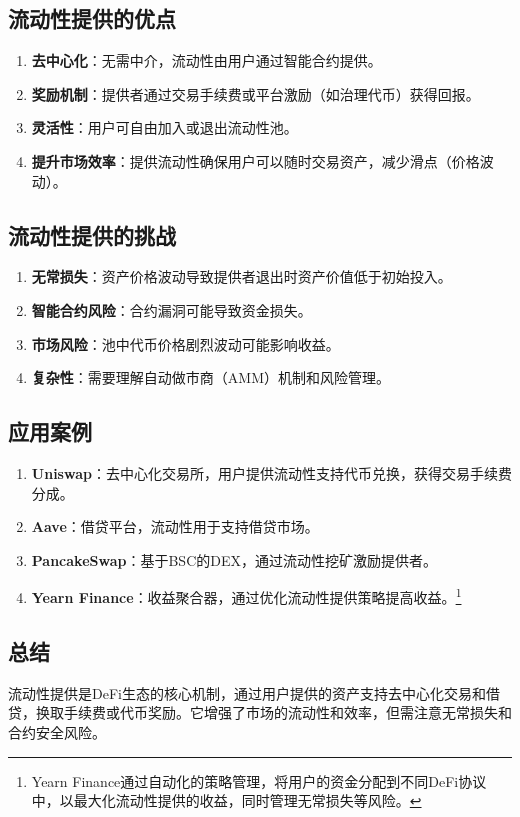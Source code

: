 \documentclass[12pt]{ctexart}
\begin{document}
\subsection{流动性提供的优点}
\begin{enumerate}
  \item \textbf{去中心化}：无需中介，流动性由用户通过智能合约提供。
  \item \textbf{奖励机制}：提供者通过交易手续费或平台激励（如治理代币）获得回报。
  \item \textbf{灵活性}：用户可自由加入或退出流动性池。
  \item \textbf{提升市场效率}：提供流动性确保用户可以随时交易资产，减少滑点（价格波动）。
\end{enumerate}

\subsection{流动性提供的挑战}
\begin{enumerate}
  \item \textbf{无常损失}：资产价格波动导致提供者退出时资产价值低于初始投入。
  \item \textbf{智能合约风险}：合约漏洞可能导致资金损失。
  \item \textbf{市场风险}：池中代币价格剧烈波动可能影响收益。
  \item \textbf{复杂性}：需要理解自动做市商（AMM）机制和风险管理。
\end{enumerate}

\subsection{应用案例}
\begin{enumerate}
  \item \textbf{Uniswap}：去中心化交易所，用户提供流动性支持代币兑换，获得交易手续费分成。
  \item \textbf{Aave}：借贷平台，流动性用于支持借贷市场。
  \item \textbf{PancakeSwap}：基于BSC的DEX，通过流动性挖矿激励提供者。
  \item \textbf{Yearn Finance}：收益聚合器，通过优化流动性提供策略提高收益。\footnote{Yearn Finance通过自动化的策略管理，将用户的资金分配到不同DeFi协议中，以最大化流动性提供的收益，同时管理无常损失等风险。}
\end{enumerate}

\subsection{总结}
流动性提供是DeFi生态的核心机制，通过用户提供的资产支持去中心化交易和借贷，换取手续费或代币奖励。它增强了市场的流动性和效率，但需注意无常损失和合约安全风险。
\end{document}
